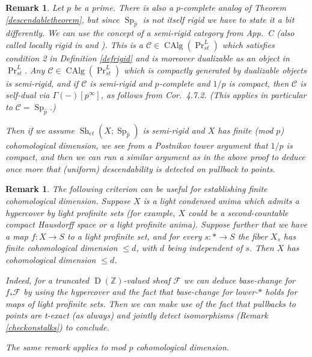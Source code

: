 \documentclass[12pt]{article}
\newtheorem{remark}[theorem]{Remark}
\newcommand{\on}{\operatorname}
\newcommand{\mbb}{\mathbb}
\newcommand{\wh}{\widehat}
\begin{document}
\begin{remark}\label{pcompletesemirigid}
Let $p$ be a prime.  There is also a $p$-complete analog of Theorem \ref{descendabletheorem}, but since $\on{Sp}_{\wh{p}}$ is not itself rigid we have to state it a bit differently.  We can use the concept of a \emph{semi-rigid} category from \cite{ArinkinLanglands} App.\ C (also called \emph{locally rigid} in \cite{EfimovKtheory} and \cite{RamziRigid}). This is a $\mathcal{C}\in\on{CAlg}(\on{Pr}^L_{st})$ which satisfies condition 2 in Definition \ref{defrigid} and is moreover dualizable as an object in $\on{Pr}^L_{st}$.  Any $\mathcal{C}\in\on{CAlg}(\on{Pr}^L_{st})$ which is compactly generated by dualizable objects is semi-rigid, and if $\mathcal{C}$ is semi-rigid and $p$-complete and $1/p$ is compact, then $\mathcal{C}$ is self-dual via $\Gamma(-)[p^\infty]$, as follows from \cite{RamziRigid} Cor.\ 4.7.2. (This applies in particular to $\mathcal{C}=\on{Sp}_{\wh{p}}$.)

Then if we assume $\on{Sh}_{et}(X;\on{Sp}_{\wh{p}})$ is semi-rigid and $X$ has finite (mod $p$) cohomological dimension, we see from a Postnikov tower argument that $1/p$ is compact, and then we can run a similar argument as in the above proof to deduce once more that (uniform) descendability is detected on pullback to points.
\end{remark}

\begin{remark}\label{cohdimfibers}
The following criterion can be useful for establishing finite cohomological dimension.  Suppose $X$ is a light condensed anima which admits a hypercover by light profinite sets (for example, $X$ could be a second-countable compact Hausdorff space or a light profinite anima).  Suppose further that we have a map $f:X \to S$ to a light profinite set, and for every $s:\ast \to S$ the fiber $X_s$ has finite cohomological dimension $\leq d$, with $d$ being independent of $s$.  Then $X$ has cohomological dimension $\leq d$.

Indeed, for a truncated $\on{D}(\mbb{Z})$-valued sheaf $\mathcal{F}$ we can deduce base-change for $f_\ast\mathcal{F}$ by using the hypercover and the fact that base-change for lower-$\ast$ holds for maps of light profinite sets.  Then we can make use of the fact that pullbacks to points are t-exact (as always) and jointly detect isomorphisms (Remark \ref{checkonstalks}) to conclude.

The same remark applies to mod $p$ cohomological dimension.
\end{remark}
\end{document}
